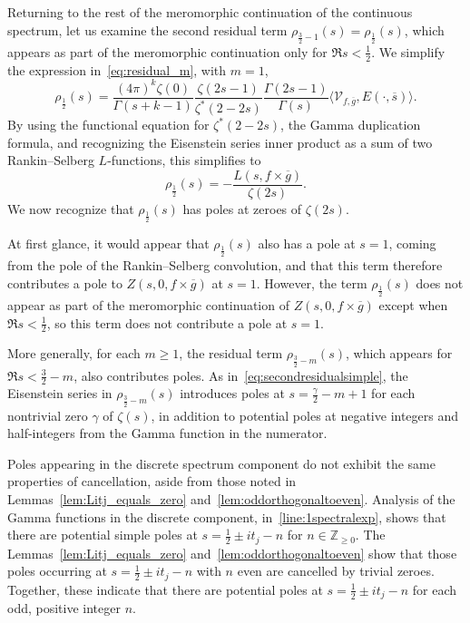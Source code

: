 Returning to the rest of the meromorphic continuation of the continuous spectrum, let us
examine the second residual term $\rho_{\frac{3}{2} - 1}(s) = \rho_{\frac{1}{2}}(s)$,
which appears as part of the meromorphic continuation only for $\Re s < \tfrac{1}{2}$.
We simplify the expression in~\eqref{eq:residual_m}, with $m = 1$,
\begin{equation}
  \rho_{\frac{1}{2}}(s) = \frac{(4\pi)^k \zeta(0)}{\Gamma(s + k - 1)} \frac{\zeta(2s
  -1)}{\zeta^*(2 - 2s)} \frac{\Gamma(2s - 1)}{\Gamma(s)} \langle
\mathcal{V}_{f,\overline{g}}, E(\cdot, \overline{s})\rangle.
\end{equation}
By using the functional equation for $\zeta^*(2 - 2s)$, the Gamma duplication formula, and
recognizing the Eisenstein series inner product as a sum of
two Rankin--Selberg $L$-functions, this simplifies to %
\begin{equation}\label{eq:secondresidualsimple}
  \rho_{\frac{1}{2}}(s) = -\frac{L(s, f\times \overline{g})}{\zeta(2s)}.
\end{equation}
We now recognize that $\rho_{\frac{1}{2}}(s)$ has poles at zeroes of $\zeta(2s)$.



\begin{remark}
  At first glance, it would appear that $\rho_{\frac{1}{2}}(s)$ also has a pole at $s=1$,
  coming from the pole of the Rankin--Selberg convolution, %
  and that this term therefore contributes a pole to $Z(s, 0, f\times \overline{g})$ at
  $s=1$.
  However, the term $\rho_{\frac{1}{2}}(s)$ does not appear as part of the meromorphic
  continuation of $Z(s, 0, f\times \overline{g})$ except when $\Re s < \frac{1}{2}$, so
  this term does not contribute a pole at $s = 1$.
\end{remark}


More generally, for each $m \geq 1$, the residual term $\rho_{\frac{3}{2} - m}(s)$, which
appears for $\Re s < \frac{3}{2} - m$, also contributes poles.
As in~\eqref{eq:secondresidualsimple}, the Eisenstein series in $\rho_{\frac{3}{2} -
m}(s)$ introduces poles at $s = \frac{\gamma}{2} - m + 1$ for each nontrivial zero
$\gamma$ of $\zeta(s)$, in addition to potential poles at negative integers and
half-integers from the Gamma function in the numerator.


Poles appearing in the discrete spectrum component do not exhibit the same properties of
cancellation, aside from those noted in Lemmas~\ref{lem:Litj_equals_zero}
and~\ref{lem:oddorthogonaltoeven}.
Analysis of the Gamma functions in the discrete component,
in~\eqref{line:1spectralexp}, shows that there are potential simple poles at $s =
\frac{1}{2} \pm it_j - n$ for $n \in \mathbb{Z}_{\geq 0}$.
The Lemmas~\ref{lem:Litj_equals_zero} and~\ref{lem:oddorthogonaltoeven} show that those
poles occurring at $s = \frac{1}{2} \pm it_j - n$ with $n$ even are cancelled by trivial
zeroes.
Together, these indicate that there are potential poles at $s = \frac{1}{2} \pm it_j - n$
for each odd, positive integer $n$.



